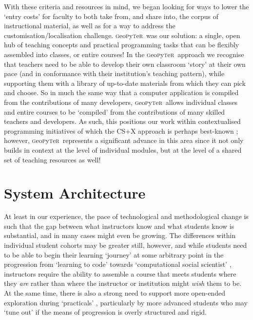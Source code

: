 \documentclass[letter, 11pt]{article}
\newcommand{\gp}{\textsc{g}eo\textsc{p}y\textsc{t}e\textsc{r}~\/}
\newcommand{\eg}{e.g.~\/}
\begin{document}
With these criteria and resources in mind, we began looking for ways to lower
the `entry costs' for faculty to both take from, and share into, the corpus of
instructional material, as well as for a way to address the
customisation/localisation challenge. \gp was our solution: a single, open hub
of teaching concepts and practical programming tasks that can be flexibly
assembled into classes, or entire courses! In the \gp approach we recognise that
teachers need to be able to develop their own classroom `story' at their own
pace (and in conformance with their institution's teaching pattern), while
supporting them with a library of up-to-date materials from which they can pick
and choose. So in much the same way that a computer application is compiled from
the contributions of many developers, \gp allows individual classes and entire
courses to be `compiled' from the contributions of many skilled teachers and
developers. As such, this positions our work within contextualised programming initiatives \citep{Guzdial2010,Lukkarinen2016} of which the CS+X approach is perhaps best-known \citep[][\eg]{Mir2017}; however, \gp represents a significant advance in this area since it not only builds in context at the level of individual modules, but at the level of a shared set of teaching resources as well!

\section{System Architecture}\label{system-architecture}

At least in our experience, the pace of technological and methodological change
is such that the gap between what instructors know and what students know is
substantial, and in many cases might even be growing. The differences within
individual student cohorts may be greater still, however, and while students
need to be able to begin their learning `journey' at some arbitrary point in the
progression from `learning to code' towards `computational social scientist'
\citep{Lazer2009}, instructors require the ability to assemble a course that
meets students where they \emph{are} rather than where the instructor or
institution might \emph{wish} them to be. At the same time, there is also a strong need to support more open-ended exploration during `practicals' \citep{Unwin1980}, particularly by more advanced students who may `tune out' if the means of progression is overly structured and rigid.
\end{document}
